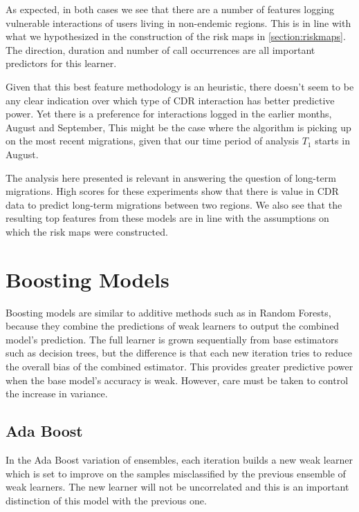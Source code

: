 As expected, in both cases we see that there are a number of features logging vulnerable interactions of users living in non-endemic regions.
This is in line with what we hypothesized in the construction of the risk maps in \cref{section:riskmaps}.
The direction, duration and number of call occurrences are all important predictors for this learner.

Given that this best feature methodology is an heuristic, there doesn't seem to be any clear indication over which type of CDR interaction has better predictive power.
Yet there is a preference for interactions logged in the earlier months, August and September,
This might be the case where the algorithm is picking up on the most recent migrations, given that our time period of analysis $T_1$ starts in August.

The analysis here presented is relevant in answering the question of long-term migrations.
High scores for these experiments show that there is value in CDR data to predict long-term migrations between two regions.
We also see that the resulting top features from these models are in line with the assumptions on which the risk maps were constructed.


\section{Boosting Models}\label{section:gradient_boosting}

Boosting models are similar to additive methods such as in Random Forests, because they combine the predictions of weak learners to output the combined model's prediction.
The full learner is grown sequentially from base estimators such as decision trees, but the difference is that each new iteration tries to reduce the overall bias of the combined estimator.
This provides greater predictive power when the base model's accuracy is weak.
However, care must be taken to control the increase in variance.

\subsection{Ada Boost}

In the Ada Boost variation of ensembles, each iteration builds a new weak learner which is set to improve on the samples misclassified by the previous ensemble of weak learners.
The new learner will not be uncorrelated and this is an important distinction of this model with the previous one.

